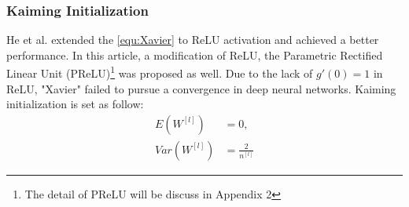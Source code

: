 \subsubsection{Kaiming Initialization}
\label{sssec:Kaiming}
He et al. \parencite{he2015delving} extended the \autoref{equ:Xavier} to ReLU
activation and achieved a better performance. In this article, a modification
of ReLU, the Parametric Rectified Linear Unit (PReLU)\footnote{The detail of 
PReLU will be discuss in Appendix 2 } was proposed as well. 
Due to the lack of $ g'(0) = 1 $ in ReLU, "Xavier" failed to pursue a convergence
in deep neural networks. Kaiming initialization is set as follow:
\begin{equation}
    \label{equ:Kaiming}
    \begin{split}
        E(W^{[l]}) & = 0, \\
        Var(W^{[l]}) & = \frac{2}{n^{[l]}}
    \end{split}
\end{equation}

